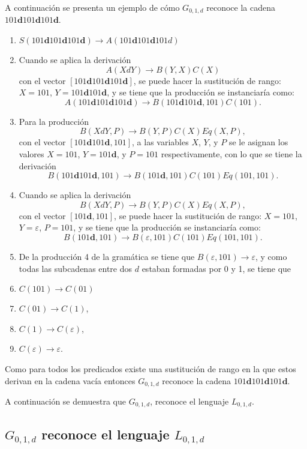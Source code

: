 \documentclass[12pt]{article}
\begin{document}
A continuación se presenta un ejemplo de cómo $G_{0,1,d}$ reconoce la cadena $101\mathbf{d}101\mathbf{d}101\mathbf{d}$.

\begin{enumerate}
    \item $S(101\mathbf{d}101\mathbf{d}101\mathbf{d}) \to A(101\mathbf{d}101\mathbf{d}101d)$
    \item Cuando se aplica la derivación
          $$A(XdY)\to B(Y,X)C(X)$$
          con el vector  $[101\mathbf{d}101\mathbf{d}101\mathbf{d}]$, se puede hacer la sustitución de rango: $X=101$, $Y=101\mathbf{d}101\mathbf{d}$, y se tiene que la producción se instanciaría como:
          $$A(101\mathbf{d}101\mathbf{d}101\mathbf{d}) \to B(101\mathbf{d}101\mathbf{d},101)C(101).$$
    \item Para la producción $$B(XdY,P)\to B(Y,P) C(X) Eq(X,P),$$
          con el vector $[101\mathbf{d}101\mathbf{d},101]$, a las variables $X$, $Y$, y $P$ se le asignan los valores $X=101$, $Y=101\mathbf{d}$, y $P=101$ respectivamente, con lo que se tiene la derivación 
          $$B(101\mathbf{d}101\mathbf{d},101) \to B(101\mathbf{d},101)C(101)Eq(101,101).$$
    \item Cuando se aplica la derivación
          $$B(XdY,P)\to B(Y,P) C(X) Eq(X,P),$$
          con el vector $[101\mathbf{d},101]$, se puede hacer la sustitución de rango: $X=101$, $Y=\varepsilon$, $P=101$, y se tiene que la producción se instanciaría como:
          $$B(101\mathbf{d},101) \to B(\varepsilon,101)C(101)Eq(101,101).$$
    \item De la producción 4 de la gramática se tiene que $B(\varepsilon,101) \to \varepsilon$, y como todas las subcadenas entre dos $d$ estaban formadas por 0 y 1, se tiene que
    \item $C(101)\to C(01)$
    \item $C(01)\to C(1)$,
    \item $C(1)\to C(\varepsilon)$,
    \item $C(\varepsilon)\to \varepsilon$.
\end{enumerate}

Como para todos los predicados existe una sustitución de rango en la que estos derivan en la cadena vacía entonces  $G_{0,1,d}$ reconoce la cadena $101\mathbf{d}101\mathbf{d}101\mathbf{d}$.

A continuación se demuestra que $G_{0,1,d}$, reconoce el lenguaje $L_{0,1,d}$.

\subsection{$G_{0,1,d}$ reconoce el lenguaje $L_{0,1,d}$}
\label{sec:demg01d}
\end{document}
